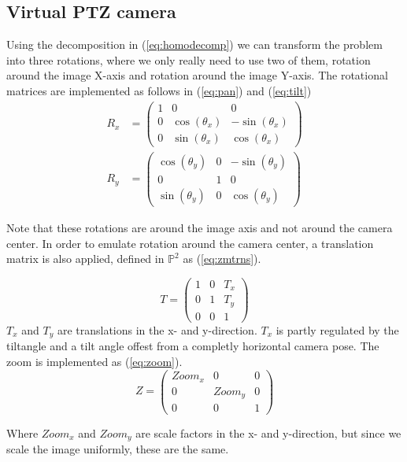 \subsection{Virtual PTZ camera}
Using the decomposition in (\ref{eq:homodecomp}) we can transform the problem into three rotations, where we only really need to use two of them, rotation around the image X-axis and rotation around the image Y-axis. The rotational matrices are implemented as follows in (\ref{eq:pan}) and (\ref{eq:tilt})
	\begin{align}
		R_x &=\begin{pmatrix}1 & 0 & 0 \\
			0 & \cos(\theta_x) & -\sin(\theta_x) \\
			0 & \sin(\theta_x) & \cos(\theta_x)
		\end{pmatrix} \label{eq:pan}\\
		R_y&=\begin{pmatrix} \cos(\theta_y) & 0 & -\sin(\theta_y) \\
			0 & 1 & 0 \\
			\sin(\theta_y) & 0 & \cos(\theta_y)
		\end{pmatrix} \label{eq:tilt}
	\end{align}

	Note that these rotations are around the image axis and not around the camera center. In order to emulate rotation around the camera center, a translation matrix is also applied, defined in $\mathbb{P}^2$ as (\ref{eq:zmtrns}).

	\begin{equation}
		T=\begin{pmatrix}
			1 & 0 & T_x \\
			0 & 1 & T_y \\
			0 & 0 & 1
		\end{pmatrix} \label{eq:zmtrns}
	\end{equation}
	$T_x$ and $T_y$ are translations in the x- and y-direction. $T_x$ is partly regulated by the tiltangle and a tilt angle offest from a completly horizontal camera pose.
	The zoom is implemented as (\ref{eq:zoom}).
	\begin{equation}
		Z=\begin{pmatrix}
			Zoom_x & 0 & 0\\
			0 & Zoom_y & 0\\
			0 & 0 & 1
		\end{pmatrix}
		\label{eq:zoom}
	\end{equation}

	Where $Zoom_x$ and $Zoom_y$ are scale factors in the x- and y-direction, but since we scale the image uniformly, these are the same.

